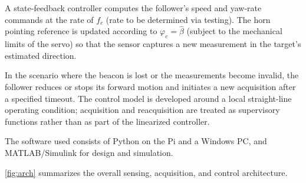 \documentclass[journal,a4paper]{IEEEtran}
\begin{document}
A state-feedback controller computes the follower's speed and yaw-rate commands at the rate of $f_c$ (rate to be determined via testing). The horn pointing reference is updated according to $\varphi_c=\hat{\beta}$ (subject to the mechanical limits of the servo) so that the sensor captures a new measurement in the target's estimated direction.

In the scenario where the beacon is lost or the measurements become invalid, the follower reduces or stops its forward motion and initiates a new acquisition after a specified timeout. The control model is developed around a local straight-line operating condition; acquisition and reacquisition are treated as supervisory functions rather than as part of the linearized controller.

The software used consists of Python on the Pi and a Windows PC, and MATLAB/Simulink for design and simulation.

\autoref{fig:arch} summarizes the overall sensing, acquisition, and control architecture. 
\end{document}
